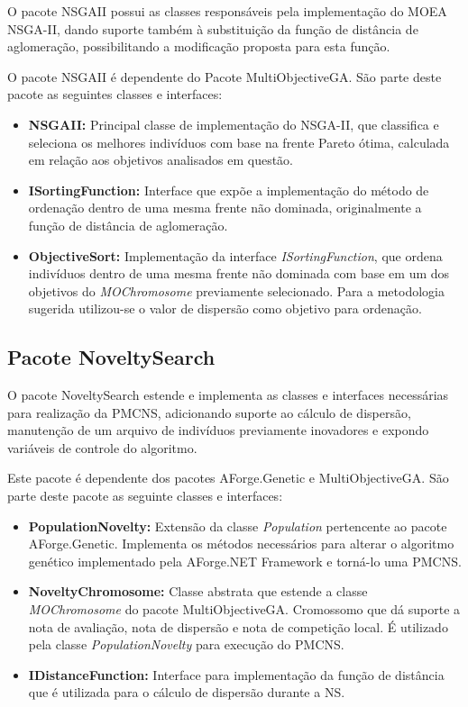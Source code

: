 O pacote NSGAII possui as classes responsáveis pela implementação do MOEA NSGA-II, dando suporte também à substituição da função de distância de aglomeração, possibilitando a modificação proposta para esta função.

O pacote NSGAII é dependente do Pacote MultiObjectiveGA. São parte deste pacote as seguintes classes e interfaces:
\vspace{-5mm}
\begin{itemize}[leftmargin=1.25\parindent]
    \item \textbf{NSGAII:} Principal classe de implementação do NSGA-II, que classifica e seleciona os melhores indivíduos com base na frente Pareto ótima, calculada em relação aos objetivos analisados em questão.
    \item \textbf{ISortingFunction:} Interface que expõe a implementação do método de ordenação dentro de uma mesma frente não dominada, originalmente a função de distância de aglomeração.
    \item \textbf{ObjectiveSort:} Implementação da interface \emph{ISortingFunction}, que ordena indivíduos dentro de uma mesma frente não dominada com base em um dos objetivos do \emph{MOChromosome} previamente selecionado. Para a metodologia sugerida utilizou-se o valor de dispersão como objetivo para ordenação.
\end{itemize}

\subsection{Pacote NoveltySearch}

O pacote NoveltySearch estende e implementa as classes e interfaces necessárias para realização da PMCNS, adicionando suporte ao cálculo de dispersão, manutenção de um arquivo de indivíduos previamente inovadores e expondo variáveis de controle do algoritmo.

Este pacote é dependente dos pacotes AForge.Genetic e MultiObjectiveGA. São parte deste pacote as seguinte classes e interfaces:
\vspace{-5mm}
\begin{itemize}[leftmargin=1.25\parindent]
    \item \textbf{PopulationNovelty:} Extensão da classe \emph{Population} pertencente ao pacote AForge.Genetic. Implementa os métodos necessários para alterar o algoritmo genético implementado pela AForge.NET Framework e torná-lo uma PMCNS.
    \item \textbf{NoveltyChromosome:} Classe abstrata que estende a classe \emph{MOChromosome} do pacote MultiObjectiveGA. Cromossomo que dá suporte a nota de avaliação, nota de dispersão e nota de competição local. É utilizado pela classe \emph{PopulationNovelty} para execução do PMCNS.
    \item \textbf{IDistanceFunction:} Interface para implementação da função de distância que é utilizada para o cálculo de dispersão durante a NS.
\end{itemize}

